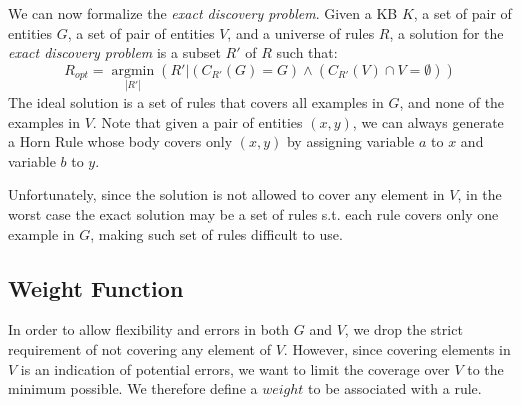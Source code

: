 We can now formalize the \emph{exact discovery problem}.
Given a KB $K$, a set of pair of entities $G$, a set of pair of entities $V$, and a universe of rules $R$, 
a solution for the \emph{exact discovery problem} is a subset $R'$ of $R$  such that:
$$R_{opt}=\underset{|R'|}{\operatorname{argmin}}(R'|(C_{R'}(G) = G) \wedge (C_{R'}(V) \cap V = \emptyset) )$$
The ideal solution is a set of rules that covers all examples in $G$, and none of the examples in $V$. Note that given a pair of entities $(x,y)$, we can always generate a Horn Rule whose body covers only $(x,y)$ by assigning variable $a$ to $x$ and variable $b$ to $y$.

Unfortunately, since the solution is not allowed to cover any element in $V$, in the worst case the exact solution may be a set of rules s.t. each rule covers only one example in $G$, making such set of rules difficult to use.

\subsection{Weight Function}
In order to allow flexibility and errors in both $G$ and $V$, we drop the strict requirement of not covering any element of $V$. However, since covering elements in $V$ is an indication of potential errors, we want to limit the coverage over $V$ to the minimum possible. We therefore define a $weight$ to be associated with a rule.


